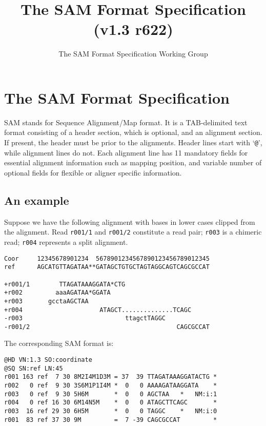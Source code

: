 \documentclass[10pt]{article}
\title{The SAM Format Specification (v1.3 r622)}
\author{The SAM Format Specification Working Group}
\begin{document}
\maketitle


\section{The SAM Format Specification}
SAM stands for Sequence Alignment/Map format. It is a TAB-delimited text
format consisting of a header section, which is optional, and an
alignment section. If present, the header must be prior to the
alignments. Header lines start with `{\tt @}', while alignment lines do
not. Each alignment line has 11 mandatory fields for essential alignment
information such as mapping position, and variable number of optional
fields for flexible or aligner specific information.

\subsection{An example}
Suppose we have the following alignment with bases in lower cases
clipped from the alignment. Read {\tt r001/1} and {\tt r001/2}
constitute a read pair; {\tt r003} is a chimeric read; {\tt r004}
represents a split alignment.

\begin{framed}\small
\begin{verbatim}
Coor     12345678901234  5678901234567890123456789012345
ref      AGCATGTTAGATAA**GATAGCTGTGCTAGTAGGCAGTCAGCGCCAT

+r001/1        TTAGATAAAGGATA*CTG
+r002         aaaAGATAA*GGATA
+r003       gcctaAGCTAA
+r004                     ATAGCT..............TCAGC
-r003                            ttagctTAGGC
-r001/2                                        CAGCGCCAT
\end{verbatim}
\end{framed}
The corresponding SAM format is:
\begin{framed}\small
\begin{verbatim}
@HD VN:1.3 SO:coordinate
@SQ SN:ref LN:45
r001 163 ref  7 30 8M2I4M1D3M = 37  39 TTAGATAAAGGATACTG *
r002   0 ref  9 30 3S6M1P1I4M *  0   0 AAAAGATAAGGATA    *
r003   0 ref  9 30 5H6M       *  0   0 AGCTAA   *   NM:i:1
r004   0 ref 16 30 6M14N5M    *  0   0 ATAGCTTCAGC       *
r003  16 ref 29 30 6H5M       *  0   0 TAGGC    *   NM:i:0
r001  83 ref 37 30 9M         =  7 -39 CAGCGCCAT         *
\end{verbatim}
\end{framed}
\end{document}
